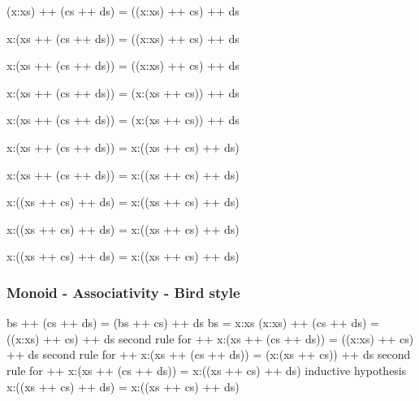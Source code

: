 \documentclass{beamer}
\newcommand{\ca}[1]{{\color{blue}#1}}
\newcommand{\cb}[1]{{\color{violet}#1}}
\newcommand{\cc}[1]{{\color{red}#1}}
\newcommand{\ce}[1]{{\color{green!50!black}#1}}
\begin{document}
\begin{frame}[t,fragile]
\begin{center}
\begin{overprint}
\begin{semiverbatim}
(\ca{x}:\cb{xs}) ++ \cc{(cs ++ ds)} = ((x:xs) ++ cs) ++ ds
\end{semiverbatim}

\begin{semiverbatim}
\ca{x}:(\cb{xs} ++ \cc{(cs ++ ds)}) = ((x:xs) ++ cs) ++ ds
\end{semiverbatim}

\begin{semiverbatim}
x:(xs ++ (cs ++ ds)) = ((\ca{x}:\cb{xs}) ++ \cc{cs}) ++ ds
\end{semiverbatim}

\begin{semiverbatim}
x:(xs ++ (cs ++ ds)) = (\ca{x}:(\cb{xs} ++ \cc{cs})) ++ ds
\end{semiverbatim}

\begin{semiverbatim}
x:(xs ++ (cs ++ ds)) = (\ca{x}:\cb{(xs ++ cs)}) ++ \cc{ds}
\end{semiverbatim}

\begin{semiverbatim}
x:(xs ++ (cs ++ ds)) = \ca{x}:(\cb{(xs ++ cs)} ++ \cc{ds})
\end{semiverbatim}

\begin{semiverbatim}
x:(\alert{xs ++ (cs ++ ds)}) = x:((xs ++ cs) ++ ds)
\end{semiverbatim}

\begin{semiverbatim}
x:(\alert{(xs ++ cs) ++ ds)} = x:((xs ++ cs) ++ ds)
\end{semiverbatim}

\begin{semiverbatim}
\alert{x:((xs ++ cs) ++ ds)} = \alert{x:((xs ++ cs) ++ ds)}
\end{semiverbatim}

\begin{semiverbatim}
x:((xs ++ cs) ++ ds) = x:((xs ++ cs) ++ ds)
\end{semiverbatim}

\end{overprint}
\end{center}

\end{frame}

\begin{frame}[fragile]
    \frametitle {Monoid - Associativity - Bird style}
\begin{semiverbatim}
    bs ++ (cs ++ ds) = (bs ++ cs) ++ ds
                  \ce{bs = x:xs}
(x:xs) ++ (cs ++ ds) = ((x:xs) ++ cs) ++ ds
              \ce{second rule for ++}
x:(xs ++ (cs ++ ds)) = ((x:xs) ++ cs) ++ ds
              \ce{second rule for ++}
x:(xs ++ (cs ++ ds)) = (x:(xs ++ cs)) ++ ds
              \ce{second rule for ++}
x:(xs ++ (cs ++ ds)) = x:((xs ++ cs) ++ ds)
             \ce{inductive hypothesis}
x:((xs ++ cs) ++ ds) = x:((xs ++ cs) ++ ds)
\end{semiverbatim}
\end{frame}
\end{document}
